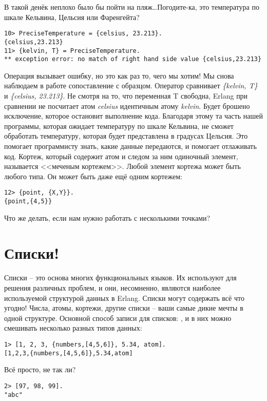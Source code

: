 В такой денёк неплохо было бы пойти на пляж\ldots Погодите\--ка, это температура по шкале Кельвина, Цельсия или Фаренгейта?
\begin{lstlisting}[style=repl]
10> PreciseTemperature = {celsius, 23.213}.
{celsius,23.213}
11> {kelvin, T} = PreciseTemperature.
** exception error: no match of right hand side value {celsius,23.213}
\end{lstlisting}

Операция вызывает ошибку, но это как раз то, чего мы хотим! Мы снова наблюдаем в работе сопоставление с образцом. Оператор \ops{=} сравнивает \emph{\{kelvin, T\}} и \emph{\{celsius, 23.213\}}. Не смотря на то, что переменная T свободна, Erlang при сравнении не посчитает атом \emph{celsius} идентичным атому \emph{kelvin}. Будет брошено исключение, которое остановит выполнение кода. Благодаря этому та часть нашей программы, которая ожидает температуру по шкале Кельвина, не сможет обработать температуру, которая будет представлена в градусах Цельсия. Это помогает программисту знать, какие данные передаются, и помогает отлаживать код. Кортеж, который содержит атом и следом за ним одиночный элемент, называется <<меченым кортежем>>. Любой элемент кортежа может быть любого типа. Он может быть даже ещё одним кортежем:
\begin{lstlisting}[style=repl]
12> {point, {X,Y}}.
{point,{4,5}}
\end{lstlisting}

Что же делать, если нам нужно работать с несколькими точками?
\section{Списки!}\label{lists}
Списки \--- это основа многих функциональных языков. Их используют для решения различных проблем, и они, несомненно, являются наиболее используемой структурой данных в Erlang. Списки могут содержать всё что угодно! Числа, атомы, кортежи, другие списки \--- ваши самые дикие мечты в одной структуре. Основной способ записи для списков: , и в них можно смешивать несколько разных типов данных:
\begin{lstlisting}[style=repl]
1> [1, 2, 3, {numbers,[4,5,6]}, 5.34, atom].
[1,2,3,{numbers,[4,5,6]},5.34,atom]
\end{lstlisting}

Всё просто, не так ли?
\begin{lstlisting}[style=repl]
2> [97, 98, 99].
"abc"
\end{lstlisting}


